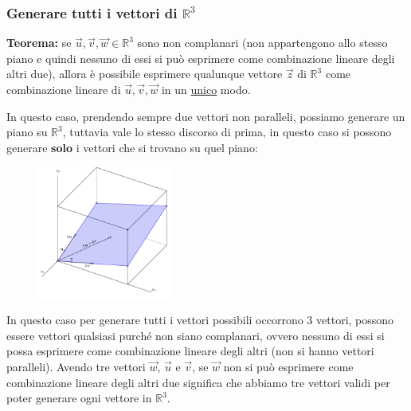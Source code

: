 \documentclass[../main.tex]{subfiles}
\begin{document}
\subsubsection{Generare tutti i vettori di $\mathbb{R}^3$}
\textbf{Teorema:} se $\vec{u},\vec{v},\vec{w} \in \mathbb{R}^3$ sono non complanari (non appartengono allo stesso piano e quindi nessuno di essi si può  esprimere come combinazione lineare degli altri due), allora è possibile esprimere qualunque vettore $\vec{z}$ di $\mathbb{R}^3$ come combinazione lineare di $\vec{u},\vec{v},\vec{w}$ in un \underline{unico} modo.

In questo caso, prendendo sempre due vettori non paralleli, possiamo generare un piano su $\mathbb{R}^3$, tuttavia vale lo stesso discorso di prima, in questo caso si possono generare \textbf{solo} i vettori che si trovano su quel piano:
\begin{figure}[h]
    \centering
    \includegraphics[width=0.4\textwidth]{../images/combinazioneLineareR3.png}
\end{figure}

In questo caso per generare tutti i vettori possibili occorrono 3 vettori, possono essere vettori qualsiasi purché non siano complanari, ovvero nessuno di essi si possa esprimere come combinazione lineare degli altri (non si hanno vettori paralleli). Avendo tre vettori $\vec{w}$, $\vec{u}$ e $\vec{v}$, se $\vec{w}$ non si può esprimere come combinazione lineare degli altri due significa che abbiamo tre vettori validi per poter generare ogni vettore in $\mathbb{R}^3$.
\end{document}
